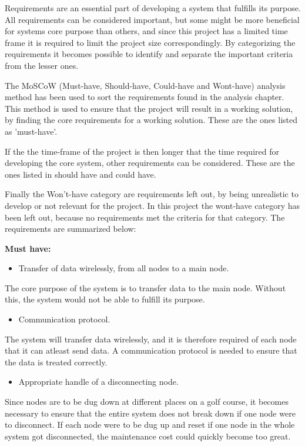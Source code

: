 Requirements are an essential part of developing a system that fulfills its purpose. All requirements can be considered important, but some might be more beneficial for systems core purpose than others, and since this project has a limited time frame it is required to limit the project size correspondingly. By categorizing the requirements it becomes possible to identify and separate the important criteria from the lesser ones.

The MoSCoW (Must-have, Should-have, Could-have and Wont-have) analysis method has been used to sort the requirements found in the analysis chapter. This method is used to ensure that the project will result in a working solution, by finding the core requirements for a working solution. These are the ones listed as 'must-have'.

If the the time-frame of the project is then longer that the time required for developing the core system, other requirements can be considered. These are the ones listed in should have and could have. 

Finally the Won't-have category are requirements left out, by being unrealistic to develop or not relevant for the project. In this project the wont-have category has been left out, because no requirements met the criteria for that category. The requirements are summarized below:

\textbf{Must have:}
\begin{itemize}
\item Transfer of data wirelessly, from all nodes to a main node.
\end{itemize}
The core purpose of the system is to transfer data to the main node. Without this, the system would not be able to fulfill its purpose.


\begin{itemize}
\item Communication protocol.
\end{itemize}
The system will transfer data wirelessly, and it is therefore required of each node that it can atleast send data. A communication protocol is needed to ensure that the data is treated correctly.


\begin{itemize}
\item Appropriate handle of a disconnecting node.
\end{itemize}
Since nodes are to be dug down at different places on a golf course, it becomes necessary to ensure that the entire system does not break down if one node were to disconnect. If each node were to be dug up and reset if one node in the whole system got disconnected, the maintenance cost could quickly become too great.


